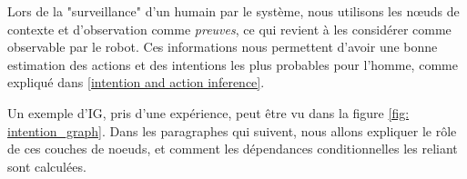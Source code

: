 \documentclass[a4paper,11pt,twoside]{StyleThese}
\begin{document}

Lors de la "surveillance" d'un humain par le système, nous utilisons les nœuds de contexte et d'observation comme \textit{preuves}, ce qui revient à les considérer comme observable par le robot. Ces informations nous permettent d'avoir une bonne estimation des actions et des intentions les plus probables pour l'homme, comme expliqué dans \ref{intention and action inference}.

Un exemple d'IG, pris d'une expérience, peut être vu dans la figure \ref{fig: intention_graph}. Dans les paragraphes qui suivent, nous allons expliquer le rôle de ces couches de noeuds, et comment les dépendances conditionnelles les reliant sont calculées.



\vspace{-10pt}
\end{document}
